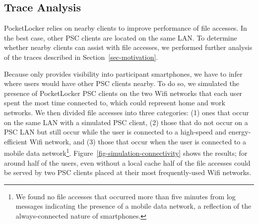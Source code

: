 \subsection{Trace Analysis}
\label{subsec-evaluation-traces}

PocketLocker relies on nearby clients to improve performance of file
accesses. In the best case, other PSC clients are located on the same LAN. To
determine whether nearby clients can assist with file accesses, we performed further
analysis of the traces described in Section~\ref{sec-motivation}.

Because \PhoneLab{} only provides visibility into participant smartphones, we
have to infer where users would have other PSC clients nearby. To do so, we
simulated the presence of PocketLocker PSC clients on the two Wifi networks
that each user spent the most time connected to, which could represent home and work
networks. We then divided file accesses into three categories: (1) ones that
occur on the same LAN with a simulated PSC client, (2) those that do not occur on a
PSC LAN but still occur while the user is connected to a high-speed and
energy-efficient Wifi network, and (3) those that occur when the user is
connected to a mobile data network\footnote{We found no file accesses that
  occurred more than five minutes from log messages indicating the presence of
  a mobile data network, a reflection of the always-connected nature of
smartphones.}. Figure~\ref{fig-simulation-connectivity} shows the results; for 
around half of the users, even without a local cache half of the file
accesses could be served by two PSC clients placed at their most
frequently-used Wifi networks. 

